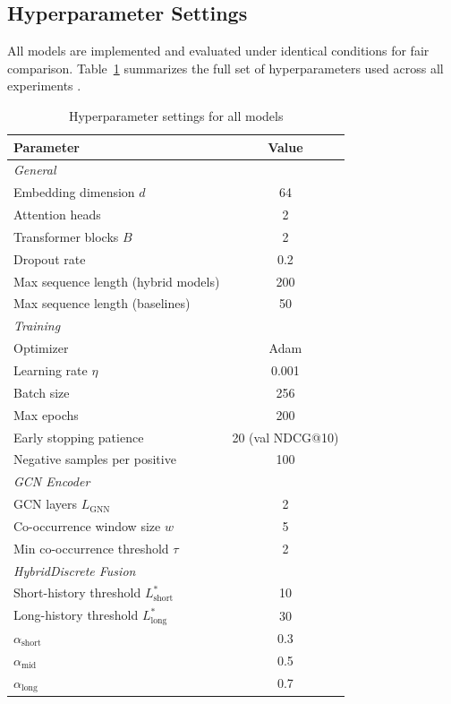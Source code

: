 \documentclass[12pt,a4paper]{report}
\newcommand{\parencite}[1]{\citep{#1}}
\begin{document}
\subsection{Hyperparameter Settings}

All models are implemented and evaluated under identical
conditions for fair comparison. Table~\ref{tab:hyperparams}
summarizes the full set of hyperparameters used across all
experiments \parencite{ouledmeriem2025hybrid}.

\begin{table}[h]
\centering
\caption{Hyperparameter settings for all models}
\label{tab:hyperparams}
\renewcommand{\arraystretch}{1.3}
\small
\begin{tabular}{lc}
\toprule
\textbf{Parameter} & \textbf{Value} \\
\midrule
\multicolumn{2}{l}{\textit{General}} \\
Embedding dimension $d$              & 64 \\
Attention heads                      & 2 \\
Transformer blocks $B$               & 2 \\
Dropout rate                         & 0.2 \\
Max sequence length (hybrid models)  & 200 \\
Max sequence length (baselines)      & 50 \\
\midrule
\multicolumn{2}{l}{\textit{Training}} \\
Optimizer                            & Adam \\
Learning rate $\eta$                 & 0.001 \\
Batch size                           & 256 \\
Max epochs                           & 200 \\
Early stopping patience              & 20 (val NDCG@10) \\
Negative samples per positive        & 100 \\
\midrule
\multicolumn{2}{l}{\textit{GCN Encoder}} \\
GCN layers $L_{\text{GNN}}$          & 2 \\
Co-occurrence window size $w$        & 5 \\
Min co-occurrence threshold $\tau$   & 2 \\
\midrule
\multicolumn{2}{l}{\textit{HybridDiscrete Fusion}} \\
Short-history threshold $L^*_{\text{short}}$ & 10 \\
Long-history threshold $L^*_{\text{long}}$   & 30 \\
$\alpha_{\text{short}}$              & 0.3 \\
$\alpha_{\text{mid}}$                & 0.5 \\
$\alpha_{\text{long}}$               & 0.7 \\
\bottomrule
\end{tabular}
\end{table}
\end{document}
